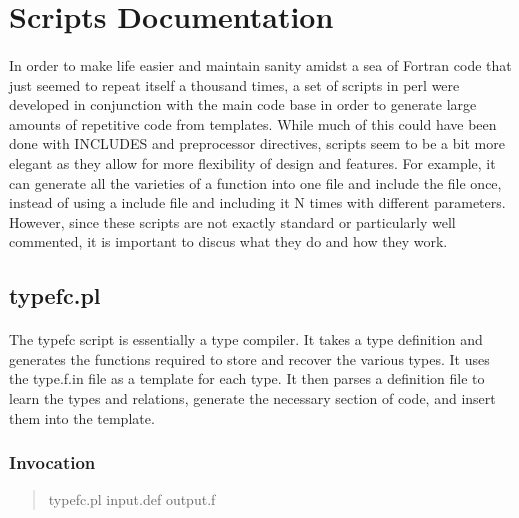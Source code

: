 \documentclass{article}
\begin{document}
\section{Scripts Documentation}
\paragraph{}
In order to make life easier and maintain sanity amidst a sea of Fortran code that just seemed to repeat itself a thousand times, a set of scripts in perl were developed in conjunction with the main code base in order to generate large amounts of repetitive code from templates. While much of this could have been done with INCLUDES and preprocessor directives, scripts seem to be a bit more elegant as they allow for more flexibility of design and features. For example, it can generate all the varieties of a function into one file and include the file once, instead of using a include file and including it N times with different parameters. However, since these scripts are not exactly standard or particularly well commented, it is important to discus what they do and how they work.
\subsection{typefc.pl}
\label{sec:typefc}
\paragraph{}
The typefc script is essentially a type compiler. It takes a type definition and generates the functions required to store and recover the various types. It uses the type.f.in file as a template for each type. It then parses a definition file to learn the types and relations, generate the necessary section of code, and insert them into the template.
\subsubsection{Invocation}
\begin{quote}
   typefc.pl input.def output.f
\end{quote}
\end{document}
